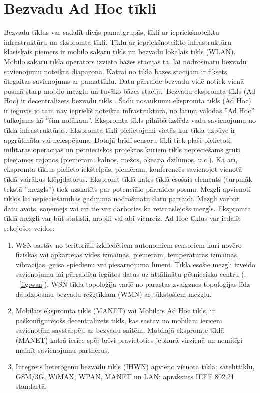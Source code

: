 \chapter{Bezvadu Ad Hoc tīkli}\label{sec:infra}
Bezvadu tīklus var sadalīt divās pamatgrupās, tīkli ar iepriekšnoteiktu infrastruktūru un ekspromta tīkli. Tīklu ar iepriekšnoteikto infrastruktūru klasiskais piemērs ir mobilo sakaru tīkls un bezvadu lokālais tīkls (\acs{WLAN}).  Mobilo sakaru tīkla operators izvieto bāzes stacijas tā, lai nodrošinātu bezvadu savienojumu noteiktā diapazonā. Katrai no tīkla bāzes stacijām ir fiksēts ātrgaitas savienojums ar pamattīklu. Datu pārraide bezvadu vidē notiek vienā posmā starp mobilo mezglu un tuvāko bāzes staciju. Bezvadu ekspromta tīkls (\acs{Ad Hoc}) ir decentralizēts bezvadu tīkls \cite{perkinsBook}. Šādu nosaukumu ekspromta tīkls (\acs{Ad Hoc}) ir ieguvis jo tam nav iepriekš noteikta infrastruktūra, no latīņu valodas ''Ad Hoc'' tulkojams kā ''šim nolūkam''.  Ekspromta tīkls pilnībā izslēdz vadu savienojumu no tīkla infrastruktūras. Ekspromta tīkli pielietojami vietās kur tīkla uzbūve ir apgrūtināta vai neiespējama. Dotajā brīdī sensoru tīkli tiek plaši pielietoti militārās operācijās un pētnieciskos projektos kuriem tīkls nepieciešams grūti pieejamos rajonos (piemēram: kalnos, mežos, okeāna dziļumos, u.c.). Kā arī, ekspromta tīklus pielieto iekštelpās, piemēram, konferencēs savienojot vienotā tīklā vairākus klēpjdatorus. Ekspromt tīklā katrs tīklā esošais elements (turpmāk tekstā ''mezgls'') tiek uzskatīts par potenciālo pārraides posmu. Mezgli apvienoti tīklos lai nepieciešamības gadījumā nodrošinātu datu pārraidi. Mezgli varbūt datu avots, saņēmējs vai arī tie var darboties kā retranslējošs mezgls. Ekspromta tīklā mezgli var būt statiski,  mobili vai abi vienreiz. Ad Hoc tīklus var iedalīt sekojošos veidos:
\begin{enumerate}[label=\arabic*)]
    \item \acf{WSN} sastāv no teritoriāli izkliedētiem autonomiem sensoriem kuri novēro fiziskas vai apkārtējas vides izmaiņas, piemēram, temperatūras izmaiņas, vibrācijas, gaisa spiedienu vai piesārņojuma līmeni. Tīklā esošie mezgli izveido savienojumu lai pārraidītu iegūtos datus uz attālinātu pētniecisko centru (\figurename. ~\ref{fig:wsn}). WSN tīkla topoloģija variē no parastas zvaigznes topoloģijas līdz daudzposmu bezvadu režģtīklam (\acs{WMN}) ar tūkstošiem mezglu.
    \item Mobilais ekspromta tīkls (\acs{MANET}) vai Mobilais Ad Hoc tīkls, ir paškonfigurējošs decentralizēts tīkls, kas sastāv no mobilām ierīcēm savienotām savstarpēji ar bezvadu saitēm. Mobilajā ekspromte tīklā (\acs{MANET}) katrā ierīce spēj brīvi pravietoties jebkurā virzienā un nemitīgi mainīt savienojumu partnerus.
    \item Integrēts heterogēnu bezvadu tīkls (\acs{IHWN}) apvieno vienotā tīklā: satelīttīklu, GSM/3G, WiMAX, WPAN, MANET un LAN; aprakstīts IEEE 802.21 standartā.
\end{enumerate}

